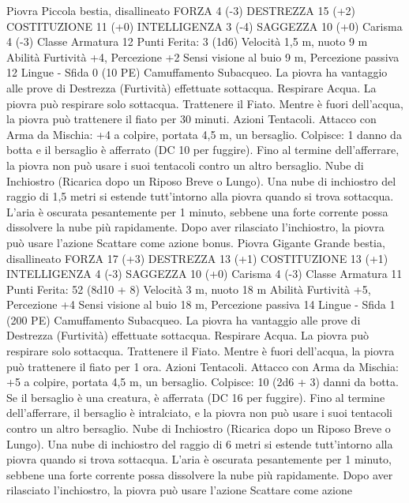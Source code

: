 \begin{multicols}{2}
Piovra
Piccola bestia, disallineato
FORZA 4 (-3)
DESTREZZA 15 (+2)
COSTITUZIONE 11 (+0)
INTELLIGENZA 3 (-4)
SAGGEZZA 10 (+0)
Carisma 4 (-3)
Classe Armatura 12
\hspace*{0pt}\hfill{Punti Ferita}: 3 (1d6)
Velocità 1,5 m, nuoto 9 m
Abilità Furtività +4, Percezione +2
Sensi visione al buio 9 m, Percezione passiva 12
Lingue -
Sfida 0 (10 PE)
Camuffamento Subacqueo. La piovra ha vantaggio alle prove di
Destrezza (Furtività) effettuate sottacqua.
Respirare Acqua. La piovra può respirare solo sottacqua.
Trattenere il Fiato. Mentre è fuori dell’acqua, la piovra può
trattenere il fiato per 30 minuti.
Azioni
Tentacoli. Attacco con Arma da Mischia: +4 a colpire, portata
4,5 m, un bersaglio.
Colpisce: 1 danno da botta e il bersaglio è afferrato (DC 10
per fuggire). Fino al termine dell’afferrare, la piovra non può
usare i suoi tentacoli contro un altro bersaglio.
Nube di Inchiostro (Ricarica dopo un Riposo Breve o Lungo).
Una nube di inchiostro del raggio di 1,5 metri si estende
tutt’intorno alla piovra quando si trova sottacqua. L’aria è
oscurata pesantemente per 1 minuto, sebbene una forte corrente
possa dissolvere la nube più rapidamente. Dopo aver rilasciato
l’inchiostro, la piovra può usare l’azione Scattare come azione
bonus.
Piovra Gigante
Grande bestia, disallineato
FORZA 17 (+3)
DESTREZZA 13 (+1)
COSTITUZIONE 13 (+1)
INTELLIGENZA 4 (-3)
SAGGEZZA 10 (+0)
Carisma 4 (-3)
Classe Armatura 11
\hspace*{0pt}\hfill{Punti Ferita}: 52 (8d10 + 8)
Velocità 3 m, nuoto 18 m
Abilità Furtività +5, Percezione +4
Sensi visione al buio 18 m, Percezione passiva 14
Lingue -
Sfida 1 (200 PE)
Camuffamento Subacqueo. La piovra ha vantaggio alle prove di
Destrezza (Furtività) effettuate sottacqua.
Respirare Acqua. La piovra può respirare solo sottacqua.
Trattenere il Fiato. Mentre è fuori dell’acqua, la piovra può
trattenere il fiato per 1 ora.
Azioni
Tentacoli. Attacco con Arma da Mischia: +5 a colpire, portata
4,5 m, un bersaglio.
Colpisce: 10 (2d6 + 3) danni da botta. Se il bersaglio è una
creatura, è afferrata (DC 16 per fuggire). Fino al termine
dell’afferrare, il bersaglio è intralciato, e la piovra non può usare
i suoi tentacoli contro un altro bersaglio.
Nube di Inchiostro (Ricarica dopo un Riposo Breve o Lungo).
Una nube di inchiostro del raggio di 6 metri si estende
tutt’intorno alla piovra quando si trova sottacqua. L’aria è
oscurata pesantemente per 1 minuto, sebbene una forte corrente
possa dissolvere la nube più rapidamente. Dopo aver rilasciato
l’inchiostro, la piovra può usare l’azione Scattare come azione

\end{multicols}
